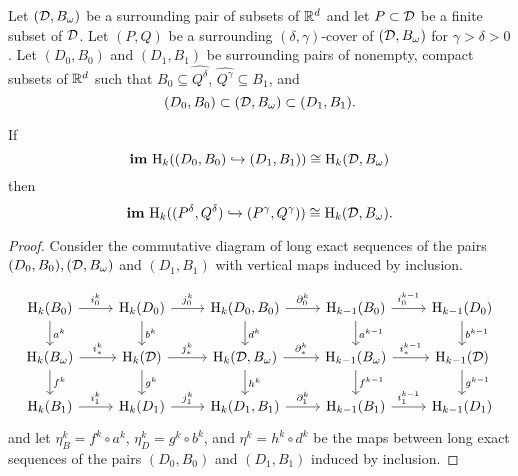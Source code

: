 
\begin{theorem}\label{thm:main}
  Let $({\mathcal{D}}, B_{\omega})$ be a surrounding pair of subsets of $\mathbb{R}^d$ and let $P\subset {\mathcal{D}}$ be a finite subset of ${\mathcal{D}}$.
  Let $(P, Q)$ be a surrounding $(\delta,\gamma)$-cover of $({\mathcal{D}}, B_{\omega})$ for $\gamma > \delta > 0$.
  Let $(D_0, B_0)$ and $(D_1, B_1)$ be surrounding pairs of nonempty, compact subsets of $\mathbb{R}^d$ such that $B_0\subseteq \hat{Q^\delta}$, $\hat{Q^\gamma}\subseteq B_1$, and
  \[ (D_0, B_0)\subset ({\mathcal{D}}, B_{\omega}) \subset (D_1, B_1).\]

  If
  \[\mathbf{im}~\mathrm{H}_k((D_0, B_0)\hookrightarrow (D_1, B_1))\cong \mathrm{H}_k({\mathcal{D}}, B_{\omega})\]
  then
  \[\mathbf{im}~\mathrm{H}_k((P^\delta, Q^\delta)\hookrightarrow (P^\gamma, Q^\gamma))\cong \mathrm{H}_k({\mathcal{D}}, B_{\omega}).\]
\end{theorem}
\begin{proof}
  Consider the commutative diagram of long exact sequences of the pairs $(D_0, B_0), ({\mathcal{D}}, B_{\omega})$ and $(D_1, B_1)$ with vertical maps induced by inclusion.

  \begin{equation}\begin{tikzcd}
      \hom_k(B_0)\arrow{r}{i^k_0}\arrow{d}{a^k} &
      \hom_k(D_0)\arrow{r}{j^k_0} \arrow{d}{b^k} &
      \hom_k(D_0, B_0)\arrow{r}{\partial^k_0}\arrow{d}{d^k} &
      \hom_{k-1}(B_0)\arrow{r}{i^{k-1}_0}\arrow{d}{a^{k-1}} &
      \hom_{k-1}(D_0) \arrow{d}{b^{k-1}}\\
      \hom_k(\B)\arrow{r}{i_*^k}\arrow{d}{f^k} &
      \hom_k(\D)\arrow{r}{j_*^k}\arrow{d}{g^k} &
      \hom_k(\D, \B)\arrow{r}{\partial_*^k}\arrow{d}{h^k} &
      \hom_{k-1}(\B)\arrow{r}{i_*^{k-1}}\arrow{d}{f^{k-1}} &
      \hom_{k-1}(\D)\arrow{d}{g^{k-1}}\\
      \hom_k(B_1)\arrow{r}{i^k_1} &
      \hom_k(D_1)\arrow{r}{j^k_1} &
      \hom_k(D_1, B_1)\arrow{r}{\partial^k_1} &
      \hom_{k-1}(B_1)\arrow{r}{i^{k-1}_1} &
      \hom_{k-1}(D_1)
  \end{tikzcd}\end{equation}
  and let $\eta_B^k = f^k\circ a^k$, $\eta_D^k = g^k \circ b^k$, and $\eta^k = h^k\circ d^k$ be the maps between long exact sequences of the pairs $(D_0, B_0)$ and $(D_1, B_1)$ induced by inclusion.


\end{proof}
